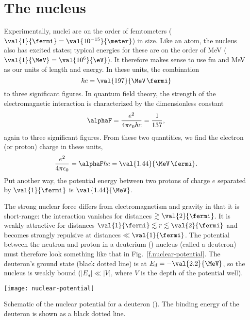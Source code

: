 
\section{The nucleus}

Experimentally, nuclei are on the order of femtometers ($\val{1}{\fermi} = \val{10^{-15}}{\meter}$) in size. Like an atom, the nucleus also has excited states; typical energies for these are on the order of MeV ($\val{1}{\MeV} = \val{10^{6}}{\eV}$).  It therefore makes sense to use fm and MeV as our units of length and energy. In these units, the combination
\[	\hbar c = \val{197}{\MeV\,\fermi} \]
to three significant figures. In quantum field theory, the strength of the electromagnetic interaction is characterized by the dimensionless constant
\[	\alphaF = \frac{e^{2}}{4\pi\epsilon_{0}\hbar c} = \frac{1}{137}, \]
again to three significant figures. From these two quantities, we find the electron (or proton) charge in these units,
\[
	\frac{e^{2}}{4\pi\epsilon_{0}} = \alphaF\hbar c = \val{1.44}{\MeV\,\fermi}.
\]
Put another way, the potential energy between two protons of charge $e$ separated by $\val{1}{\fermi}$ is $\val{1.44}{\MeV}$.

The strong nuclear force differs from electromagnetism and gravity in that it is short-range: the interaction vanishes for distances $\gtrsim\val{2}{\fermi}$. It is weakly attractive for distances $\val{1}{\fermi}\lesssim r\lesssim\val{2}{\fermi}$ and becomes strongly repulsive at distances $\ll\val{1}{\fermi}$. The potential between the neutron and proton in a deuterium (\hydrogen[2]) nucleus (called a deuteron) must therefore look something like that in Fig.~\ref{f.nuclear-potential}. The deuteron's ground state (black dotted line) is at $E_{d} = -\val{2.2}{\MeV}$, so the nucleus is weakly bound ($|E_{d}| \ll |V|$, where $V$ is the depth of the potential well).

\begin{marginfigure}[-8\baselineskip]
\texttt{[image: nuclear-potential]}
\caption[Schematic of the nuclear potential]{\label{f.nuclear-potential}Schematic of the nuclear potential for a deuteron (\hydrogen[2]). The binding energy of the deuteron is shown as a black dotted line.}
\end{marginfigure}

